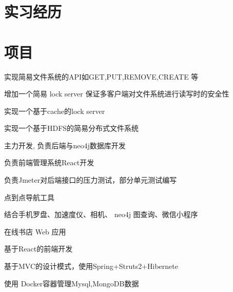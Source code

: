 \documentclass[]{deedy-resume-openfont}
\begin{document}
\begin{minipage}[t]{0.68\textwidth} 


\section{实习经历}
\sectionsep


\sectionsep
\section{项目}
\sectionsep

\descript{}
\vspace{\topsep}
\begin{tightemize}
    \item 实现简易文件系统的API如GET,PUT,REMOVE,CREATE 等
    \item 增加一个简易 lock server 保证多客户端对文件系统进行读写时的安全性
    \item 实现一个基于cache的lock server 
    \item 实现一个基于HDFS的简易分布式文件系统
\end{tightemize}
\sectionsep

\begin{tightemize}
    \item 主力开发, 负责后端与neo4j数据库开发
    \item 负责前端管理系统React开发
    \item 负责Jmeter对后端接口的压力测试，部分单元测试编写
    \item 点到点导航工具
    \item 结合手机罗盘、加速度仪、相机、 neo4j 图查询、微信小程序
\end{tightemize}
\sectionsep

\begin{tightemize}
    \item 在线书店 Web 应用
    \item 基于React的前端开发
    \item 基于MVC的设计模式，使用Spring+Struts2+Hibernete
    \item 使用 Docker容器管理Mysql,MongoDB数据
\end{tightemize}
\sectionsep


\end{minipage}
\end{document}
